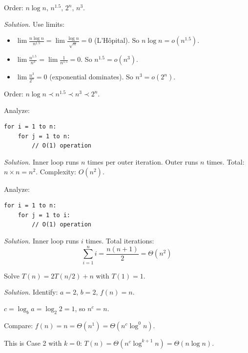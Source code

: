 \begin{example}
Order: $n \log n$, $n^{1.5}$, $2^n$, $n^3$.

\emph{Solution.} Use limits:
\begin{itemize}
  \item $\lim \frac{n \log n}{n^{1.5}} = \lim \frac{\log n}{\sqrt{n}} = 0$ (L'Hôpital). So $n \log n = o(n^{1.5})$.
  \item $\lim \frac{n^{1.5}}{n^3} = \lim \frac{1}{n^{1.5}} = 0$. So $n^{1.5} = o(n^3)$.
  \item $\lim \frac{n^3}{2^n} = 0$ (exponential dominates). So $n^3 = o(2^n)$.
\end{itemize}

Order: $n \log n \prec n^{1.5} \prec n^3 \prec 2^n$.
\end{example}

\begin{example}
Analyze:
\begin{verbatim}
for i = 1 to n:
    for j = 1 to n:
        // O(1) operation
\end{verbatim}

\emph{Solution.} Inner loop runs $n$ times per outer iteration. Outer runs $n$ times. Total: $n \times n = n^2$. Complexity: $O(n^2)$.
\end{example}

\begin{example}
Analyze:
\begin{verbatim}
for i = 1 to n:
    for j = 1 to i:
        // O(1) operation
\end{verbatim}

\emph{Solution.} Inner loop runs $i$ times. Total iterations:
\[
\sum_{i=1}^n i = \frac{n(n+1)}{2} = \Theta(n^2)
\]
\end{example}

\begin{example}
Solve $T(n) = 2T(n/2) + n$ with $T(1) = 1$.

\emph{Solution.} Identify: $a = 2$, $b = 2$, $f(n) = n$.

$c = \log_b a = \log_2 2 = 1$, so $n^c = n$.

Compare: $f(n) = n = \Theta(n^1) = \Theta(n^c \log^0 n)$.

This is Case 2 with $k = 0$: $T(n) = \Theta(n^c \log^{k+1} n) = \Theta(n \log n)$.
\end{example}


